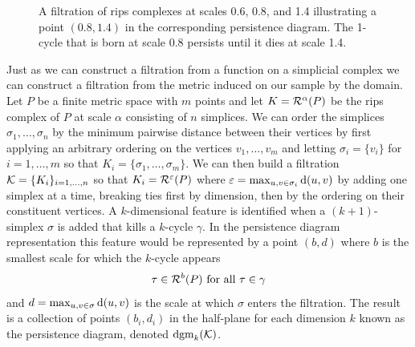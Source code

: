 \begin{figure}[htbp]
    \caption{A filtration of rips complexes at scales 0.6, 0.8, and 1.4 illustrating a point $(0.8, 1.4)$ in the corresponding persistence diagram. The 1-cycle that is born at scale 0.8 persists until it dies at scale 1.4.}
    \label{fig:persist}
\end{figure}



Just as we can construct a filtration from a function on a simplicial complex we can construct a filtration from the metric induced on our sample by the domain.
Let $P$ be a finite metric space with $m$ points and let $K = \mathcal{R}^\alpha(P)$ be the rips complex of $P$ at scale $\alpha$ consisting of $n$ simplices.
We can order the simplices $\sigma_1,\ldots,\sigma_n$ by the minimum pairwise distance between their vertices by first applying an arbitrary ordering on the vertices $v_1,\ldots,v_m$ and letting $\sigma_i = \{v_i\}$ for $i=1,\ldots,m$ so that $K_i = \{\sigma_1,\ldots, \sigma_m\}$.
We can then build a filtration ${\mathcal{K}} = \{K_i\}_{i=1,\ldots,n}$ so that $K_i = \mathcal{R}^\varepsilon(P)$ where $\varepsilon = \max_{u,v\in\sigma_i}\mathrm{d}(u,v)$ by adding one simplex at a time, breaking ties first by dimension, then by the ordering on their constituent vertices.
A $k$-dimensional feature is identified when a $(k+1)$-simplex $\sigma$ is added that kills a $k$-cycle $\gamma$.
In the persistence diagram representation this feature would be represented by a point $(b, d)$ where $b$ is the smallest scale for which the $k$-cycle appears
\[ \tau\in\mathcal{R}^b(P)\text{ for all }\tau\in\gamma\]
and $d = \max_{u,v\in\sigma}\mathrm{d}(u,v)$ is the scale at which $\sigma$ enters the filtration.
The result is a collection of points $(b_i, d_i)$ in the half-plane for each dimension $k$ known as the persistence diagram, denoted $\mathrm{dgm}_k({\mathcal{K}})$.

